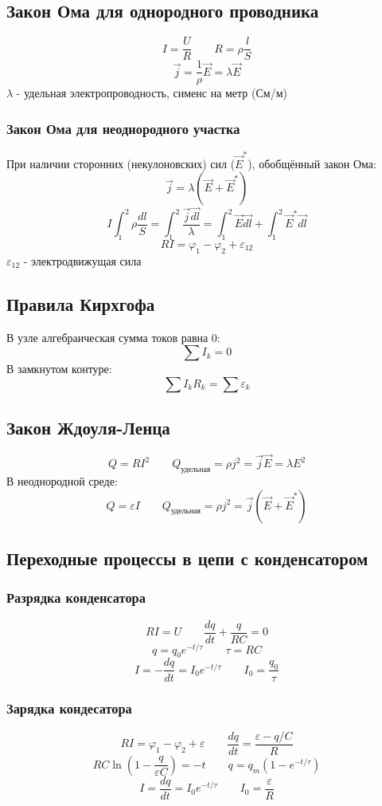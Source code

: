 \documentclass{article}
\begin{document}
\subsection{Закон Ома для однородного проводника}
\[I=\frac{U}{R} \qquad R=\rho\frac{l}{S}\]
\[\vec{j}=\frac{1}{\rho}\vec{E}=\lambda\vec{E}\]
$\lambda$ - удельная электропроводность, сименс на метр (См/м)
\subsubsection{Закон Ома для неоднородного участка}
При наличии сторонних (некулоновских) сил ($\vec{E}^{*}$), обобщённый закон Ома:
\[\vec{j}=\lambda(\vec{E}+\vec{E}^{*})\]
\[I\int_{1}^{2}\rho\frac{dl}{S}=\int_{1}^{2}\frac{\vec{j}\vec{dl}}{\lambda}=\int_{1}^{2}\vec{E}\vec{dl}+\int_{1}^{2}\vec{E}^{*}\vec{dl}\]
\[RI=\varphi_{1}-\varphi_{2}+\varepsilon_{12}\]
$\varepsilon_{12}$ - электродвижущая сила

\subsection{Правила Кирхгофа}
В узле алгебраическая сумма токов равна 0:
\[\sum I_{k}=0\]
В замкнутом контуре:
\[\sum I_{k}R_{k}=\sum\varepsilon_{k}\]

\subsection{Закон Ждоуля-Ленца}
\[Q=RI^{2} \qquad Q_{\text{удельная}}=\rho j^{2}=\vec{j}\vec{E}=\lambda E^{2}\]
В неоднородной среде:
\[Q=\varepsilon I \qquad Q_{\text{удельная}}=\rho j^{2}=\vec{j}(\vec{E}+\vec{E}^{*})\]

\subsection{Переходные процессы в цепи с конденсатором}
\subsubsection{Разрядка конденсатора}
\[RI=U \qquad \frac{dq}{dt}+\frac{q}{RC}=0\]
\[q=q_{0}e^{-t/\tau} \qquad \tau=RC\]
\[I=-\frac{dq}{dt}=I_{0}e^{-t/\tau} \qquad I_{0}=\frac{q_{0}}{\tau}\]
\subsubsection{Зарядка кондесатора}
\[RI=\varphi_{1}-\varphi_{2}+\varepsilon \qquad \frac{dq}{dt}=\frac{\varepsilon-q/C}{R}\]
\[RC\ln(1-\frac{q}{\varepsilon C})=-t \qquad q=q_{m}(1-e^{-t/\tau})\]
\[I=\frac{dq}{dt}=I_{0}e^{-t/\tau} \qquad I_{0}=\frac{\varepsilon}{R}\]
\end{document}
